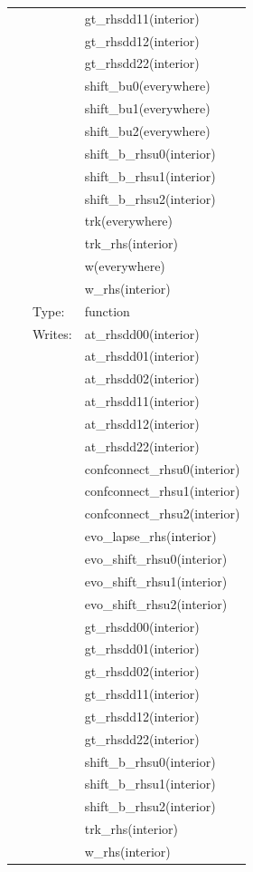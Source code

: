 \begin{tabular*}{160mm}{cll}
~& ~ &gt\_rhsdd11(interior)\\ 
~& ~ &gt\_rhsdd12(interior)\\ 
~& ~ &gt\_rhsdd22(interior)\\ 
~& ~ &shift\_bu0(everywhere)\\ 
~& ~ &shift\_bu1(everywhere)\\ 
~& ~ &shift\_bu2(everywhere)\\ 
~& ~ &shift\_b\_rhsu0(interior)\\ 
~& ~ &shift\_b\_rhsu1(interior)\\ 
~& ~ &shift\_b\_rhsu2(interior)\\ 
~& ~ &trk(everywhere)\\ 
~& ~ &trk\_rhs(interior)\\ 
~& ~ &w(everywhere)\\ 
~& ~ &w\_rhs(interior)\\ 
~ & Type:  & function \\ 
~ & Writes:  & at\_rhsdd00(interior) \\ 
~& ~ &at\_rhsdd01(interior)\\ 
~& ~ &at\_rhsdd02(interior)\\ 
~& ~ &at\_rhsdd11(interior)\\ 
~& ~ &at\_rhsdd12(interior)\\ 
~& ~ &at\_rhsdd22(interior)\\ 
~& ~ &confconnect\_rhsu0(interior)\\ 
~& ~ &confconnect\_rhsu1(interior)\\ 
~& ~ &confconnect\_rhsu2(interior)\\ 
~& ~ &evo\_lapse\_rhs(interior)\\ 
~& ~ &evo\_shift\_rhsu0(interior)\\ 
~& ~ &evo\_shift\_rhsu1(interior)\\ 
~& ~ &evo\_shift\_rhsu2(interior)\\ 
~& ~ &gt\_rhsdd00(interior)\\ 
~& ~ &gt\_rhsdd01(interior)\\ 
~& ~ &gt\_rhsdd02(interior)\\ 
~& ~ &gt\_rhsdd11(interior)\\ 
~& ~ &gt\_rhsdd12(interior)\\ 
~& ~ &gt\_rhsdd22(interior)\\ 
~& ~ &shift\_b\_rhsu0(interior)\\ 
~& ~ &shift\_b\_rhsu1(interior)\\ 
~& ~ &shift\_b\_rhsu2(interior)\\ 
~& ~ &trk\_rhs(interior)\\ 
~& ~ &w\_rhs(interior)\\ 
\end{tabular*} 


